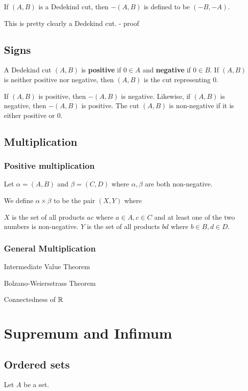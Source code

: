 If $(A,B)$ is a Dedekind cut, then $-(A,B)$ is defined to be
$(-B,-A)$.

This is pretty clearly a Dedekind cut. - proof

\subsection{Signs}
A Dedekind cut $(A,B)$ is \textbf{positive} if $0 \in A$ and \textbf{negative} if $0 \in B$. If $(A,B)$ is neither positive nor negative, then $(A,B)$ is the cut representing 0.

If $(A,B)$ is positive, then $-(A,B)$ is negative. Likewise, if $(A,B)$ is negative, then $-(A,B)$ is positive. The cut $(A,B)$ is non-negative if it is either positive or 0.

\subsection{Multiplication}

\subsubsection{Positive multiplication}
Let $\alpha = (A,B)$ and $\beta = (C,D)$ where $\alpha, \beta$ are both non-negative.

We define $\alpha \times \beta$ to be the pair $(X,Y)$ where

$X$ is the set of all products $ac$ where $a \in A, c \in C$ and at least one of the two numbers is non-negative. 
$Y$ is the set of all products $bd$ where $b \in B, d \in D$.

\subsubsection{General Multiplication}



Intermediate Value Theorem

Bolzano-Weiersstrass Theorem

Connectedness of $\mathbb R$


\section{Supremum and Infimum}
\subsection{Ordered sets}
Let $A$ be a set.

